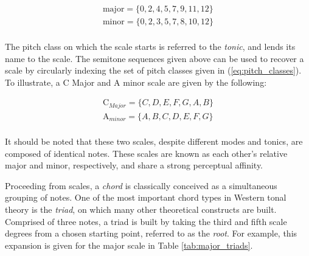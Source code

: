 \begin{centering}
\label{eq:scales}
\begin{align*}
\text{major} = \{0, 2, 4, 5, 7, 9, 11, 12\} \\
\text{minor} = \{0, 2, 3, 5, 7, 8, 10, 12\} \\
\end{align*}
\end{centering}

The pitch class on which the scale starts is referred to the \emph{tonic}, and lends its name to the scale.
The semitone sequences given above can be used to recover a scale by circularly indexing the set of pitch classes given in (\ref{eq:pitch_classes}).
To illustrate, a C Major and A minor scale are given by the following:

\begin{align*}
\text{C$_{Major}$} = \{C, D, E, F, G, A, B\} \\
\text{A$_{minor}$} = \{A, B, C, D, E, F, G\} \\
\end{align*}

\noindent It should be noted that these two scales, despite different modes and tonics, are composed of identical notes.
These scales are known as each other's relative major and minor, respectively, and share a strong perceptual affinity.


Proceeding from scales, a \emph{chord} is classically conceived as a simultaneous grouping of notes.
One of the most important chord types in Western tonal theory is the \emph{triad}, on which many other theoretical constructs are built.
Comprised of three notes, a triad is built by taking the third and fifth scale degrees from a chosen starting point, referred to as the \emph{root}.
For example, this expansion is given for the major scale in Table \ref{tab:major_triads}.

